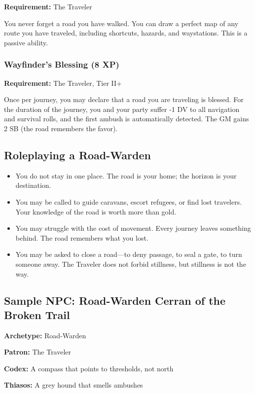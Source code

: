 \textbf{Requirement:} The Traveler

You never forget a road you have walked. You can draw a perfect map of any route you have traveled, including shortcuts, hazards, and waystations. This is a passive ability.

\subsubsection{Wayfinder's Blessing (8 XP)}

\textbf{Requirement:} The Traveler, Tier II+

Once per journey, you may declare that a road you are traveling is blessed. For the duration of the journey, you and your party suffer -1 DV to all navigation and survival rolls, and the first ambush is automatically detected. The GM gains 2 SB (the road remembers the favor).

\subsection{Roleplaying a Road-Warden}

\begin{itemize}
\item You do not stay in one place. The road is your home; the horizon is your destination.
\item You may be called to guide caravans, escort refugees, or find lost travelers. Your knowledge of the road is worth more than gold.
\item You may struggle with the cost of movement. Every journey leaves something behind. The road remembers what you lost.
\item You may be asked to close a road—to deny passage, to seal a gate, to turn someone away. The Traveler does not forbid stillness, but stillness is not the way.
\end{itemize}

\subsection{Sample NPC: Road-Warden Cerran of the Broken Trail}

\textbf{Archetype:} Road-Warden

\textbf{Patron:} The Traveler

\textbf{Codex:} A compass that points to thresholds, not north

\textbf{Thiasos:} A grey hound that smells ambushes

